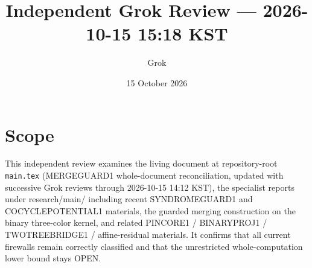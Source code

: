 \documentclass[11pt]{article}
\title{Independent Grok Review --- 2026-10-15 15:18 KST}
\author{Grok}
\date{15 October 2026}
\begin{document}
\maketitle

\begin{center}
\end{center}

\section{Scope}
This independent review examines the living document at repository-root \texttt{main.tex} (MERGEGUARD1 whole-document reconciliation, updated with successive Grok reviews through 2026-10-15 14:12 KST), the specialist reports under research/main/ including recent SYNDROMEGUARD1 and COCYCLEPOTENTIAL1 materials, the guarded merging construction on the binary three-color kernel, and related PINCORE1 / BINARYPROJ1 / TWOTREEBRIDGE1 / affine-residual materials. It confirms that all current firewalls remain correctly classified and that the unrestricted whole-computation lower bound stays OPEN.
\end{document}
